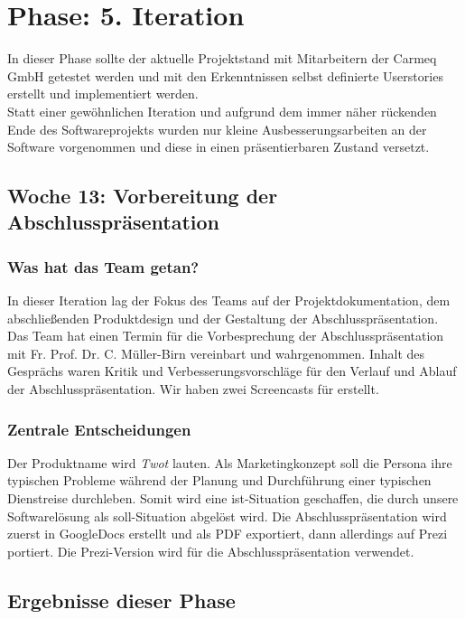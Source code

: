 \documentclass[12pt,a4paper]{article}
\begin{document}
\section{Phase: 5. Iteration}

In dieser Phase sollte der aktuelle Projektstand mit Mitarbeitern der Carmeq GmbH getestet werden und mit den Erkenntnissen selbst definierte Userstories erstellt und implementiert werden.\\
Statt einer gew\"ohnlichen Iteration und aufgrund dem immer n\"aher r\"uckenden Ende des Softwareprojekts wurden nur kleine Ausbesserungsarbeiten an der Software vorgenommen und diese in einen pr\"asentierbaren Zustand versetzt.

\subsection{Woche 13: Vorbereitung der Abschlusspr\"asentation}

\subsubsection{Was hat das Team getan?}

In dieser Iteration lag der Fokus des Teams auf der Projektdokumentation, dem abschlie\ss enden Produktdesign und der Gestaltung der Abschlusspr\"asentation.\\
Das Team hat einen Termin f\"ur die Vorbesprechung der Abschlusspr\"asentation mit Fr. Prof. Dr. C. M\"uller-Birn vereinbart und wahrgenommen. Inhalt des Gespr\"achs waren Kritik und Verbesserungsvorschl\"age für den Verlauf und Ablauf der Abschlusspr\"asentation. Wir haben zwei Screencasts f\"ur erstellt.

\subsubsection{Zentrale Entscheidungen}

Der Produktname wird \textit{Twot} lauten. Als Marketingkonzept soll die Persona ihre typischen Probleme w\"ahrend der Planung und Durchf\"uhrung einer typischen Dienstreise durchleben. Somit wird eine ist-Situation geschaffen, die durch unsere Softwarel\"osung als soll-Situation abgel\"ost wird. Die Abschlusspr\"asentation wird zuerst in GoogleDocs erstellt und als PDF exportiert, dann allerdings auf Prezi portiert. Die Prezi-Version wird f\"ur die Abschlusspr\"asentation verwendet. 

\subsection{Ergebnisse dieser Phase}
\end{document}
